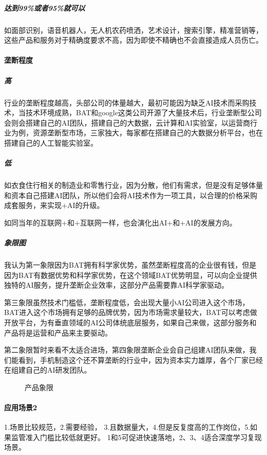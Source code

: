 \documentclass[letterpaper,11pt,english]{sphinxmanual}
\let\sphinxpxdimen\pdfpxdimen\else\newdimen\sphinxpxdimen
\begin{document}
\subparagraph{达到99\%或者95\%就可以}
\label{\detokenize{chapter_project/AI_industry_analysis:id17}}
如面部识别，语音机器人，无人机农药喷洒，艺术设计，搜索引擎，精准营销等，这些产品和服务对于精确度要求不高，因为即使不精确也不会直接造成人员伤亡。


\paragraph{垄断程度}
\label{\detokenize{chapter_project/AI_industry_analysis:id18}}

\subparagraph{高}
\label{\detokenize{chapter_project/AI_industry_analysis:id19}}
行业的垄断程度越高，头部公司的体量越大，最初可能因为缺乏AI技术而采购技术，当技术环境成熟，BAT和google这类公司开源了大量技术后，行业垄断型公司会则会搭建自己的AI团队，搭建自己的大数据，云计算和AI实验室，以运营商行业为例，资源垄断型市场，三家独大，每家都在搭建自己的大数据分析平台，也在搭建自己的人工智能实验室。


\subparagraph{低}
\label{\detokenize{chapter_project/AI_industry_analysis:id20}}
如衣食住行相关的制造业和零售行业，因为分散，他们有需求，但是没有足够体量和资本自己搭建AI团队，所以他们会将AI技术作为一项工具，以合理的价格采购成套服务，来实现+AI的升级。

如同当年的互联网+和+互联网一样，也会演化出AI+和+AI的发展方向。


\subparagraph{象限图}
\label{\detokenize{chapter_project/AI_industry_analysis:id21}}
我认为第一象限因为BAT拥有科学家优势，虽然垄断程度高的企业很有钱，但是因为BAT有数据优势和科学家优势，在这个领域BAT优势明显，可以向企业提供独特的AI服务，提升垄断企业效率，这部分产品需要靠AI科学家驱动。

第三象限虽然技术门槛低，垄断程度低，会出现大量小AI公司进入这个市场，BAT进入这个市场拥有足够的品牌优势，因为市场需求量较大，BAT可以考虑做开放平台，为有垂直领域的AI公司体统底层服务，如果自己来做，这部分服务和产品将是运营和产品来主要驱动。

第二象限暂时来看不太适合进场，第四象限垄断企业会自己组建AI团队来做，我们能看到，手机制造这个还不算垄断的行业中，因为资本实力雄厚，各个厂家已经在组建自己的AI研发团队。

\begin{figure}[H]
\centering
\capstart

\noindent\sphinxincludegraphics[width=600\sphinxpxdimen]{{产品象限}.png}
\caption{产品象限}\label{\detokenize{chapter_project/AI_industry_analysis:id31}}\end{figure}


\paragraph{应用场景2\sphinxfootnotemark[647]}
\label{\detokenize{chapter_project/AI_industry_analysis:id22}}%
\begin{footnotetext}[647]\sphinxAtStartFootnote
{}
%
\end{footnotetext}\ignorespaces 
1.场景比较规范，2.需要经验，
3.且数据量大，4.但是反复度高的工作岗位，5.如果监管准入门槛比较低就更好。
1和5可促进快速落地，2、3、4适合深度学习复现场景。
\end{document}
